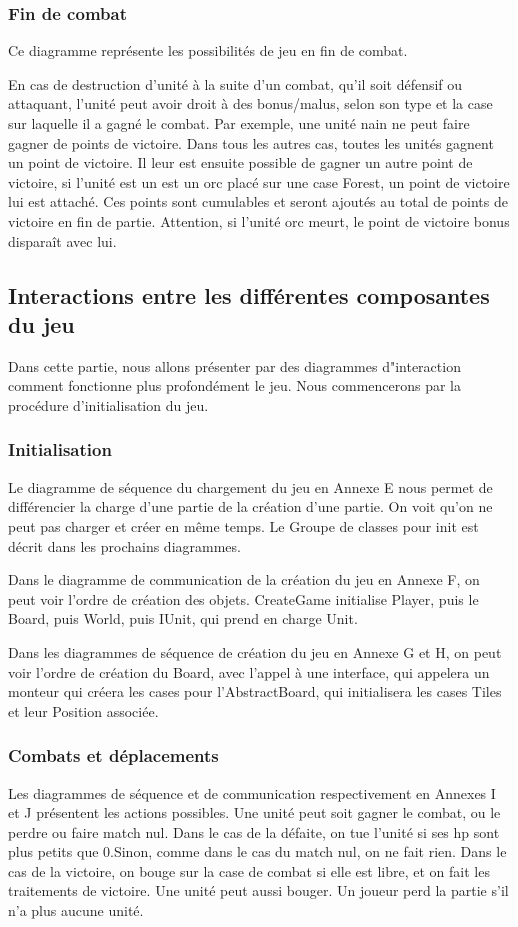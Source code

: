 \subsubsection{Fin de combat}

Ce diagramme représente les possibilités de jeu en fin de combat. 

En cas de destruction d'unité à la suite d'un combat, qu'il soit défensif ou attaquant, l'unité peut avoir droit à des bonus/malus, selon son type et la case sur laquelle il a gagné le combat. Par exemple, une unité nain ne peut faire gagner de points de victoire. Dans tous les autres cas, toutes les unités gagnent un point de victoire. Il leur est ensuite possible de gagner un autre point de victoire, si l'unité est un est un orc placé sur une case Forest, un point de victoire lui est attaché. Ces points sont cumulables et seront ajoutés au total de points de victoire en fin de partie. Attention, si l'unité orc meurt, le point de victoire bonus disparaît avec lui. 

\subsection{Interactions entre les différentes composantes du jeu}

Dans cette partie, nous allons présenter par des diagrammes d"interaction comment fonctionne plus profondément le jeu. Nous commencerons par la procédure d'initialisation du jeu.
\subsubsection{Initialisation}

Le diagramme de séquence du chargement du jeu en Annexe E nous permet de différencier la charge d'une partie de la création d'une partie. On voit qu'on ne peut pas charger et créer en même temps. Le Groupe de classes pour init est décrit dans les prochains diagrammes.

Dans le diagramme de communication de la création du jeu en Annexe F, on peut voir l'ordre de création des objets. CreateGame initialise Player, puis le Board, puis World, puis IUnit, qui prend en charge Unit.

Dans les diagrammes de séquence de création du jeu en Annexe G et H, on peut voir l'ordre de création du Board, avec l'appel à une interface, qui appelera un monteur qui créera les cases pour l'AbstractBoard, qui initialisera les cases Tiles et leur Position associée.

\subsubsection{Combats et déplacements}
Les diagrammes de séquence et de communication respectivement en Annexes I et J présentent les actions possibles. 
Une unité peut soit gagner le combat, ou le perdre ou faire match nul. Dans le cas de la défaite, on tue l'unité si ses hp sont plus petits que 0.Sinon, comme dans le cas du match nul, on ne fait rien. Dans le cas de la victoire, on bouge sur la case de combat si elle est libre, et on fait les traitements de victoire. Une unité peut aussi bouger. Un joueur perd la partie s'il n'a plus aucune unité.